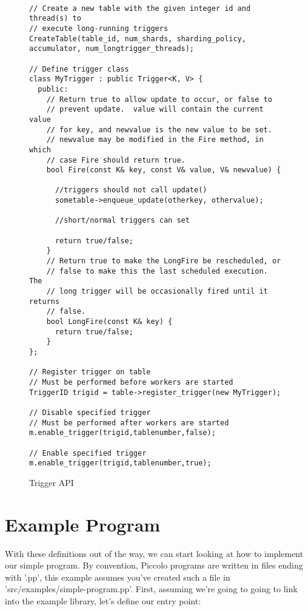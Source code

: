 \documentclass[10pt]{article}
\newcommand{\p}{Piccolo\xspace}
\begin{document}
 \begin{figure}[h!]
\begin{lstlisting}

// Create a new table with the given integer id and thread(s) to
// execute long-running triggers
CreateTable(table_id, num_shards, sharding_policy, accumulator, num_longtrigger_threads);

// Define trigger class
class MyTrigger : public Trigger<K, V> {
  public:
    // Return true to allow update to occur, or false to
    // prevent update.  value will contain the current value
    // for key, and newvalue is the new value to be set.
    // newvalue may be modified in the Fire method, in which
    // case Fire should return true.
    bool Fire(const K& key, const V& value, V& newvalue) {

      //triggers should not call update()
      sometable->enqueue_update(otherkey, othervalue);

      //short/normal triggers can set 

      return true/false;
    }
    // Return true to make the LongFire be rescheduled, or
    // false to make this the last scheduled execution.  The
    // long trigger will be occasionally fired until it returns
    // false.
    bool LongFire(const K& key) {
      return true/false;
    }
};

// Register trigger on table
// Must be performed before workers are started
TriggerID trigid = table->register_trigger(new MyTrigger);

// Disable specified trigger
// Must be performed after workers are started
m.enable_trigger(trigid,tablenumber,false);

// Enable specified trigger
m.enable_trigger(trigid,tablenumber,true);

\end{lstlisting}
\caption{\sffamily Trigger API}
\label{fig:trigapi}
\end{figure}

\section{Example Program}
With these definitions out of the way, we can start looking at how to implement
our simple program.  By convention, \p programs are written in files ending with
'.pp', this example assumes you've created such a file in
'src/examples/simple-program.pp'.  First, assuming we're going to going to link
into the example library, let's define our entry point:
\end{document}
